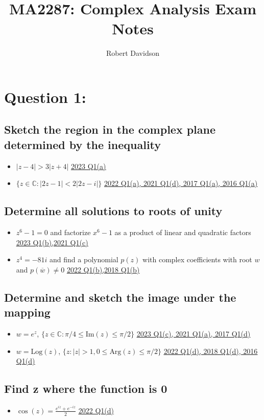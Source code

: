 \documentclass[a4paper, 8pt]{extarticle}
\title{
\textbf{MA2287: Complex Analysis Exam Notes} \\ 
}
\author{
  Robert Davidson
}
\date{} %
\begin{document}
\maketitle
\pagebreak

\section{Question 1: }
\subsection{Sketch the region in the complex plane determined by the inequality}
\begin{itemize}
	\item $|z - 4| > 3|z+4|$ \hfill \hyperref[sol:2023Q1a]{\uline{2023 Q1(a)}}
	\item $\{ z \in \mathbb{C} : |2z - 1| < 2|2z-i|\}$ \hfill  \hyperref[sol:2022Q1a]{\uline{2022 Q1(a), 2021 Q1(d), 2017 Q1(a), 2016 Q1(a)}}
\end{itemize}
\subsection{Determine all solutions to roots of unity}
\begin{itemize}
	\item $z^6 -1 = 0$ and factorize $x^6 -1$ as a product of linear and quadratic factors \hfill \hyperref[sol:2023Q1b]{\uline{2023 Q1(b),2021 Q1(c)}}
	\item $z^4 = -81i$ and find a polynomial $p(z)$ with complex coefficients with root $w$ and $p(\overline{w}) \neq 0$ \hfill \hyperref[sol:20188Q1b]{\uline{2022 Q1(b),2018 Q1(b)}}

\end{itemize}
\subsection{Determine and sketch the image under the mapping}
\begin{itemize}
	\item $w = e^z$, $\{z \in \mathbb{C} : \pi / 4 \leq \text{Im}(z) \leq \pi /2\}$ \hfill \hyperref[sol:2023Q1c]{\uline{2023 Q1(c), 2021 Q1(a), 2017 Q1(d)}}
	\item $w = \text{Log}(z)$, $\{z: |z| > 1, 0 \leq \text{Arg}(z) \leq \pi / 2\}$  \hfill \hyperref[sol:2022Q1d]{\uline{2022 Q1(d), 2018 Q1(d), 2016 Q1(d)}}
\end{itemize}
\subsection{Find z where the function is 0}
\begin{itemize}
	\item $\cos(z) = \frac{e^{iz} + e^{-iz}}{2}$ \hfill \hyperref[sol:2023Q1d]{\uline{2022 Q1(d)}}
\end{itemize}
\end{document}
